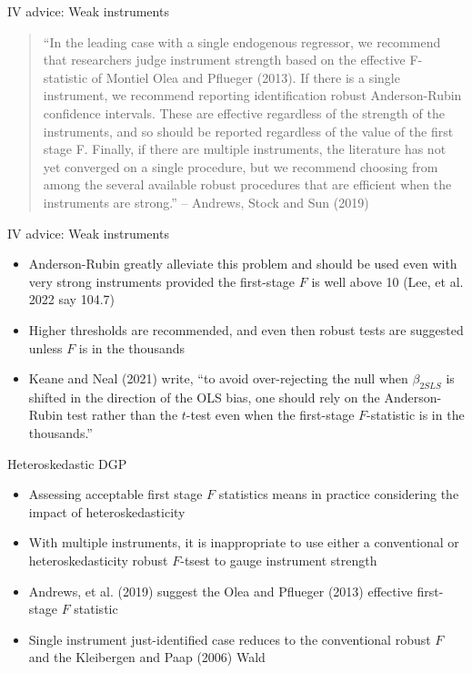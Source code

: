 \documentclass{beamer}
\begin{document}
\begin{frame}{IV advice: Weak instruments}

\begin{quote}
``In the leading case with a single endogenous regressor, we recommend that researchers judge instrument strength based on the effective F-statistic of Montiel Olea and Pflueger (2013).  If there is a single instrument, we recommend reporting identification robust Anderson-Rubin confidence intervals. These are effective regardless of the strength of the instruments, and so should be reported regardless of the value of the first stage F.  Finally, if there are multiple instruments, the literature has not yet converged on a single procedure, but we recommend choosing from among the several available robust procedures that are efficient when the instruments are strong.'' -- Andrews, Stock and Sun (2019)
\end{quote}

\end{frame}


\begin{frame}{IV advice: Weak instruments}

\begin{itemize}
	\item Anderson-Rubin greatly alleviate this problem and should be used even with very strong instruments provided the first-stage $F$ is well above 10 (Lee, et al. 2022 say 104.7)
	\item Higher thresholds are recommended, and even then robust tests are suggested unless $F$ is in the thousands
	\item Keane and Neal (2021) write, ``to avoid over-rejecting the null when $\beta_{2SLS}$ is shifted in the direction of the OLS bias, one should rely on the Anderson-Rubin test rather than the $t$-test even when the first-stage $F$-statistic is in the thousands.'' 
\end{itemize}

\end{frame}

\begin{frame}{Heteroskedastic DGP}

\begin{itemize}
\item Assessing acceptable first stage $F$ statistics means in practice considering the impact of heteroskedasticity
\item With multiple instruments, it is inappropriate to use either a conventional or heteroskedasticity robust $F$-tsest to gauge instrument strength
\item Andrews, et al. (2019) suggest the Olea and Pflueger (2013) effective first-stage $F$ statistic
\item Single instrument just-identified case reduces to the conventional robust $F$ and the Kleibergen and Paap (2006) Wald
\end{itemize}

\end{frame}
\end{document}
